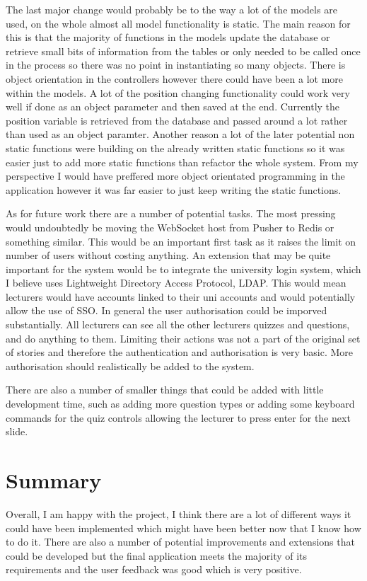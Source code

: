 The last major change would probably be to the way a lot of the models are used, on the whole almost all model functionality is static. The main reason for this is that the majority of functions in the models update the database or retrieve small bits of information from the tables or only needed to be called once in the process so there was no point in instantiating so many objects. There is object orientation in the controllers however there could have been a lot more within the models. A lot of the position changing functionality could work very well if done as an object parameter and then saved at the end. Currently the position variable is retrieved from the database and passed around a lot rather than used as an object paramter. Another reason a lot of the later potential non static functions were building on the already written static functions so it was easier just to add more static functions than refactor the whole system. From my perspective I would have preffered more object orientated programming in the application however it was far easier to just keep writing the static functions.

As for future work there are a number of potential tasks. The most pressing would undoubtedly be moving the WebSocket host from Pusher to Redis or something similar. This would be an important first task as it raises the limit on number of users without costing anything. An extension that may be quite important for the system would be to integrate the university login system, which I believe uses Lightweight Directory Access Protocol, LDAP. This would mean lecturers would have accounts linked to their uni accounts and would potentially allow the use of SSO. In general the user authorisation could be imporved substantially. All lecturers can see all the other lecturers quizzes and questions, and do anything to them. Limiting their actions was not a part of the original set of stories and therefore the authentication and authorisation is very basic. More authorisation should realistically be added to the system.

There are also a number of smaller things that could be added with little development time, such as adding more question types or adding some keyboard commands for the quiz controls allowing the lecturer to press enter for the next slide.

\section{Summary}
Overall, I am happy with the project, I think there are a lot of different ways it could have been implemented which might have been better now that I know how to do it. There are also a number of potential improvements and extensions that could be developed but the final application meets the majority of its requirements and the user feedback was good which is very positive.